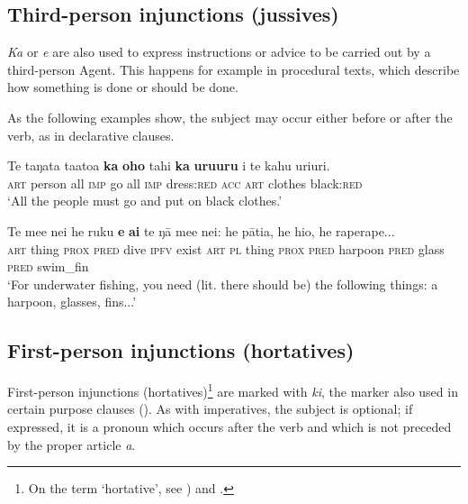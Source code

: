 \subsection{Third-person injunctions (jussives)}\label{sec:10.2.2}

\textit{Ka} or \textit{e} are also used to express instructions or advice to be carried out by a third-person Agent. This happens for example in procedural texts, which describe how something is done or should be done.

As the following examples show, the subject may occur either before or after the verb, as in declarative clauses.

\ea\label{ex:10.10}
\gll Te taŋata ta{\ꞌ}ato{\ꞌ}a \textbf{ka} \textbf{oho} tahi \textbf{ka} \textbf{uruuru} i te kahu {\ꞌ}uri{\ꞌ}uri. \\
\textsc{art} person all \textsc{imp} go all \textsc{imp} dress:\textsc{red} \textsc{acc} \textsc{art} clothes black:\textsc{red} \\

\glt 
‘All the people must go and put on black clothes.’ \textstyleExampleref{[R210.164]} 
\z

\ea\label{ex:10.11}
\gll Te me{\ꞌ}e nei he ruku \textbf{e} \textbf{ai} te ŋā me{\ꞌ}e nei: he pātia, he hi{\ꞌ}o, he raperape...\\
\textsc{art} thing \textsc{prox} \textsc{pred} dive \textsc{ipfv} exist \textsc{art} \textsc{pl} thing \textsc{prox} \textsc{pred} harpoon \textsc{pred} glass \textsc{pred} swim\_fin\\

\glt 
‘For underwater fishing, you need (lit. there should be) the following things: a harpoon, glasses, fins...’ \textstyleExampleref{[R360.001]} 
\z
{}
\subsection{First-person injunctions (hortatives)}\label{sec:10.2.3}
First-person injunctions (hortatives)\footnote{\label{fn:485}On the term ‘hortative’, see \citet[305, 313]{KönigSiemund2007}) and \citet[207]{Andrews2007Noun}.} are marked with \textit{ki}, the marker also used in certain purpose clauses (). As with imperatives, the subject is optional; if expressed, it is a pronoun which occurs after the verb and which is not preceded by the proper article \textit{a}. 

